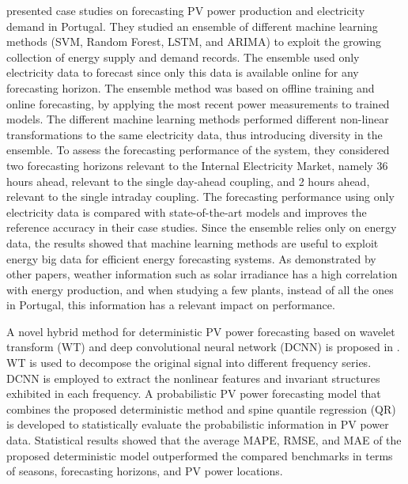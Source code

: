 \cite{9248865} presented case studies on forecasting PV power production and electricity demand in Portugal.
They studied an ensemble of different machine learning methods (SVM, Random Forest, LSTM, and ARIMA) to exploit the growing collection of energy supply and demand records.
The ensemble used only electricity data to forecast since only this data is available online for any forecasting horizon.
The ensemble method was based on offline training and online forecasting, by applying the most recent power measurements to trained models.
The different machine learning methods performed different non-linear transformations to the same electricity data, thus introducing diversity in the ensemble.
To assess the forecasting performance of the system, they considered two forecasting horizons relevant to the Internal Electricity Market, namely 36 hours ahead, relevant to the single day-ahead coupling, and 2 hours ahead, relevant to the single intraday coupling.
The forecasting performance using only electricity data is compared with state-of-the-art models and improves the reference accuracy in their case studies.
Since the ensemble relies only on energy data, the results showed that machine learning methods are useful to exploit energy big data for efficient energy forecasting systems.
As demonstrated by other papers, weather information such as solar irradiance has a high correlation with energy production, and when studying a few plants, instead of all the ones in Portugal, this information has a relevant impact on performance.

A novel hybrid method for deterministic PV power forecasting based on wavelet transform (WT) and deep convolutional neural network (DCNN) is proposed in \cite{WANG2017409}.
WT is used to decompose the original signal into different frequency series.
DCNN is employed to extract the nonlinear features and invariant structures exhibited in each frequency.
A probabilistic PV power forecasting model that combines the proposed deterministic method and spine quantile regression (QR) is developed to statistically evaluate the probabilistic information in PV power data.
Statistical results showed that the average MAPE, RMSE, and MAE of the proposed deterministic model outperformed the compared benchmarks in terms of seasons, forecasting horizons, and PV power locations.

